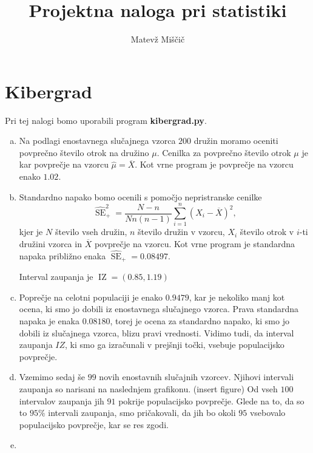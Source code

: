 \documentclass[a4paper,12pt]{article}
\title{Projektna naloga pri statistiki}
\author{Matevž Miščič}
\theoremstyle{definition}
\theoremstyle{plain}
\DeclareMathOperator*{\SE}{SE}
\DeclareMathOperator*{\IZ}{IZ}
\begin{document}
\maketitle{}

\section{Kibergrad}

Pri tej nalogi bomo uporabili program \textbf{kibergrad.py}.

\begin{enumerate}[a)]
    \item Na podlagi enostavnega slučajnega vzorca $200$ družin moramo oceniti povprečno število otrok na družino $\mu$. Cenilka za povprečno število otrok $\mu$ je kar povprečje na vzorcu $\widehat{\mu} = \overline{X}$. Kot vrne program je povprečje na vzorcu enako $1.02$.
    
    \item Standardno napako bomo ocenili s pomočjo nepristranske cenilke 
    $$\widehat{\SE}_{+}^2 = \frac{N - n}{Nn(n - 1)}\sum_{i = 1}^n (X_i - \overline{X})^2,$$ kjer je $N$ število vseh družin, $n$ število družin v vzorcu, $X_i$ število otrok v $i$-ti družini vzorca in $\overline{X}$ povprečje na vzorcu. Kot vrne program je standardna napaka približno enaka $\widehat{\SE}_{+} = 0.08497$.

    Interval zaupanja je $\IZ = \left( 0.85, 1.19 \right)$

    \item Poprečje na celotni populaciji je enako $0.9479$, kar je nekoliko manj kot ocena, ki smo jo dobili iz enostavnega slučajnego vzorca. Prava standardna napaka je enaka $0.08180$, torej je ocena za standardno napako, ki smo jo dobili iz slučajnega vzorca, blizu pravi vrednosti. Vidimo tudi, da interval zaupanja $IZ$, ki smo ga izračunali v prejšnji točki, vsebuje populacijsko povprečje.
    
    \item Vzemimo sedaj še $99$ novih enostavnih slučajnih vzorcev. Njihovi intervali zaupanja so narisani na naslednjem grafikonu. (insert figure)
    Od vseh $100$ intervalov zaupanja jih $91$ pokrije populacijsko povprečje. Glede na to, da so to $95 \%$ intervali zaupanja, smo pričakovali, da jih bo okoli $95$ vsebovalo populacijsko povprečje, kar se res zgodi.
    
    \item 
\end{enumerate}
\end{document}
